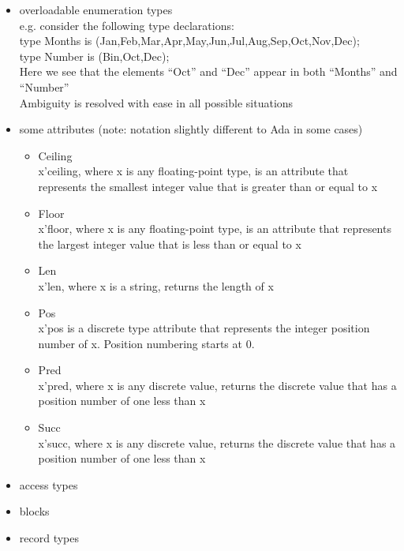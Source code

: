 \documentclass[onecolumn,11pt]{article}
\begin{document}
\begin{itemize}
\item{
  overloadable enumeration types \\
  e.g. consider the following type declarations: \\
  \indent type Months is (Jan,Feb,Mar,Apr,May,Jun,Jul,Aug,Sep,Oct,Nov,Dec); \\
  \indent type Number is (Bin,Oct,Dec); \\
  Here we see that the elements ``Oct'' and ``Dec'' appear in both ``Months'' and ``Number''\\
  Ambiguity is resolved with ease in all possible situations
}

\item{
  some attributes (note: notation slightly different to Ada in some cases)
  \begin{itemize}
    \item{
      Ceiling \\
      x'ceiling, where x is any floating-point type, is an attribute that represents the smallest integer value that is greater than or equal to x
    }
    \item{
      Floor \\
      x'floor, where x is any floating-point type, is an attribute that represents the largest integer value that is less than or equal to x
    }
    \item{
      Len \\
      x'len, where x is a string, returns the length of x
    }
    \item{
      Pos \\
      x'pos is a discrete type attribute that represents the integer position number of x. Position numbering starts at 0.
    }
    \item{
      Pred \\
      x'pred, where x is any discrete value, returns the discrete value that has a position number of one less than x
    }
    \item{
      Succ \\
      x'succ, where x is any discrete value, returns the discrete value that has a position number of one less than x
    }
  \end{itemize}
}


\item{access types}

\item{blocks}

\item{record types}


\end{itemize}
\end{document}
